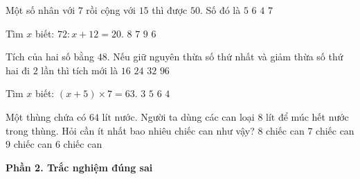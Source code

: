 \begin{ex} %
Một số nhân với $7$ rồi cộng với $15$ thì được $50$. Số đó là
\choice
{\True $5$}
{$6$}
{$4$}
{$7$}
\end{ex}

\begin{ex} %
Tìm $x$ biết: $72 : x + 12 = 20$.
\choice
{$8$}
{$7$}
{\True $9$}
{$6$}
\end{ex}

\begin{ex} %
Tích của hai số bằng $48$. Nếu giữ nguyên thừa số thứ nhất và giảm thừa số thứ hai đi $2$ lần thì tích mới là
\choice
{$16$}
{\True $24$}
{$32$}
{$96$}
\end{ex}

\begin{ex} %
Tìm $x$ biết: $(x + 5) \times 7 = 63$.
\choice
{$3$}
{$5$}
{$6$}
{\True $4$}
\end{ex}

\begin{ex} %
Một thùng chứa có $64\text{ lít}$ nước. Người ta dùng các can loại $8\text{ lít}$ để múc hết nước trong thùng. Hỏi cần ít nhất bao nhiêu chiếc can như vậy?
\choice
{\True $8$ chiếc can}
{$7$ chiếc can}
{$9$ chiếc can}
{$6$ chiếc can}
\end{ex}

\textbf{Phần 2. Trắc nghiệm đúng sai}

